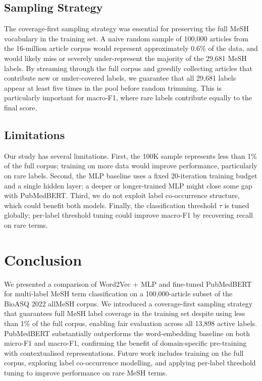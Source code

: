 \documentclass[sigconf]{acmart}
\begin{document}
\subsection{Sampling Strategy}

The coverage-first sampling strategy was essential for preserving the full MeSH vocabulary in
the training set. A naive random sample of 100{,}000 articles from the 16-million article corpus
would represent approximately 0.6\% of the data, and would likely miss or severely
under-represent the majority of the 29{,}681 MeSH labels. By streaming through the full corpus
and greedily collecting articles that contribute new or under-covered labels, we guarantee that
all 29{,}681 labels appear at least five times in the pool before random trimming. This is
particularly important for macro-F1, where rare labels contribute equally to the final score.

\subsection{Limitations}

Our study has several limitations. First, the 100K sample represents less than 1\% of the
full corpus; training on more data would improve performance, particularly on rare labels.
Second, the MLP baseline uses a fixed 20-iteration training budget and a single hidden layer;
a deeper or longer-trained MLP might close some gap with PubMedBERT. Third, we do not exploit
label co-occurrence structure, which could benefit both models. Finally, the classification
threshold $\tau$ is tuned globally; per-label threshold tuning could improve macro-F1 by
recovering recall on rare terms.

\section{Conclusion}
\label{sec:conclusion}

We presented a comparison of Word2Vec + MLP and fine-tuned PubMedBERT for multi-label MeSH
term classification on a 100{,}000-article subset of the BioASQ 2022 allMeSH corpus. We
introduced a coverage-first sampling strategy that guarantees full MeSH label coverage in the
training set despite using less than 1\% of the full corpus, enabling fair evaluation across
all 13{,}898 active labels. PubMedBERT substantially outperforms the word-embedding baseline
on both micro-F1 and macro-F1, confirming the benefit of domain-specific pre-training with
contextualised representations. Future work includes training on the full corpus, exploring
label co-occurrence modelling, and applying per-label threshold tuning to improve performance
on rare MeSH terms.



\end{document}
